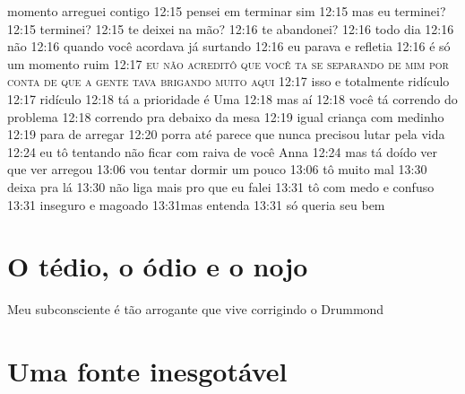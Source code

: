 {momento arreguei contigo 12:15 pensei em terminar sim 12:15 mas eu
terminei? 12:15 terminei? 12:15 te deixei na mão? 12:16 te abandonei?
12:16 todo dia 12:16 não 12:16 quando você acordava já surtando 12:16 eu
parava e refletia 12:16 é só um momento ruim 12:17 \textsc{eu não acreditô que
você ta se separando de mim por conta de que a gente tava brigando muito
aqui} 12:17 isso e totalmente ridículo 12:17 ridículo 12:18 tá a
prioridade é Uma 12:18 mas aí 12:18 você tá correndo do problema 12:18
correndo pra debaixo da mesa 12:19 igual criança com medinho 12:19 para
de arregar 12:20 porra até parece que nunca precisou lutar pela vida
12:24 eu tô tentando não ficar com raiva de você Anna 12:24 mas tá doído
ver que ver arregou 13:06 vou tentar dormir um pouco 13:06 tô muito mal
13:30 deixa pra lá 13:30 não liga mais pro que eu falei 13:31 tô com
medo e confuso 13:31 inseguro e magoado 13:31mas entenda 13:31 só queria
seu bem
}

\chapter{O tédio, o ódio e o nojo}

Meu subconsciente é tão arrogante que vive corrigindo o Drummond

\chapter{Uma fonte inesgotável}

